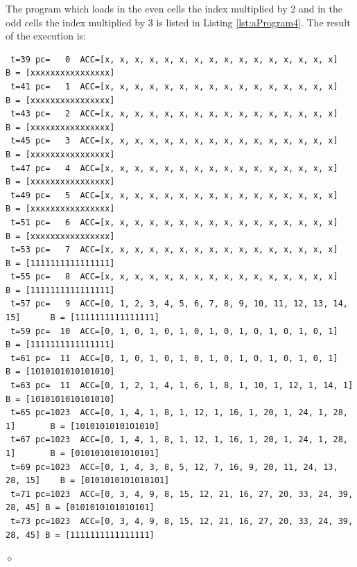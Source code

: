 \begin{exemplu}
The program which loads in the even cells the index multiplied by 2 and in the odd cells the index multiplied by 3 is listed in Listing \ref{lst:aProgram4}.
{\em 
{}
}
The result of the execution is:
{\scriptsize
\begin{verbatim}
 t=39 pc=   0  ACC=[x, x, x, x, x, x, x, x, x, x, x, x, x, x, x, x]            B = [xxxxxxxxxxxxxxxx]
 t=41 pc=   1  ACC=[x, x, x, x, x, x, x, x, x, x, x, x, x, x, x, x]            B = [xxxxxxxxxxxxxxxx]
 t=43 pc=   2  ACC=[x, x, x, x, x, x, x, x, x, x, x, x, x, x, x, x]            B = [xxxxxxxxxxxxxxxx]
 t=45 pc=   3  ACC=[x, x, x, x, x, x, x, x, x, x, x, x, x, x, x, x]            B = [xxxxxxxxxxxxxxxx]
 t=47 pc=   4  ACC=[x, x, x, x, x, x, x, x, x, x, x, x, x, x, x, x]            B = [xxxxxxxxxxxxxxxx]
 t=49 pc=   5  ACC=[x, x, x, x, x, x, x, x, x, x, x, x, x, x, x, x]            B = [xxxxxxxxxxxxxxxx]
 t=51 pc=   6  ACC=[x, x, x, x, x, x, x, x, x, x, x, x, x, x, x, x]            B = [xxxxxxxxxxxxxxxx]
 t=53 pc=   7  ACC=[x, x, x, x, x, x, x, x, x, x, x, x, x, x, x, x]            B = [1111111111111111]
 t=55 pc=   8  ACC=[x, x, x, x, x, x, x, x, x, x, x, x, x, x, x, x]            B = [1111111111111111]
 t=57 pc=   9  ACC=[0, 1, 2, 3, 4, 5, 6, 7, 8, 9, 10, 11, 12, 13, 14, 15]      B = [1111111111111111]
 t=59 pc=  10  ACC=[0, 1, 0, 1, 0, 1, 0, 1, 0, 1, 0, 1, 0, 1, 0, 1]            B = [1111111111111111]
 t=61 pc=  11  ACC=[0, 1, 0, 1, 0, 1, 0, 1, 0, 1, 0, 1, 0, 1, 0, 1]            B = [1010101010101010]
 t=63 pc=  11  ACC=[0, 1, 2, 1, 4, 1, 6, 1, 8, 1, 10, 1, 12, 1, 14, 1]         B = [1010101010101010]
 t=65 pc=1023  ACC=[0, 1, 4, 1, 8, 1, 12, 1, 16, 1, 20, 1, 24, 1, 28, 1]       B = [1010101010101010]
 t=67 pc=1023  ACC=[0, 1, 4, 1, 8, 1, 12, 1, 16, 1, 20, 1, 24, 1, 28, 1]       B = [0101010101010101]
 t=69 pc=1023  ACC=[0, 1, 4, 3, 8, 5, 12, 7, 16, 9, 20, 11, 24, 13, 28, 15]    B = [0101010101010101]
 t=71 pc=1023  ACC=[0, 3, 4, 9, 8, 15, 12, 21, 16, 27, 20, 33, 24, 39, 28, 45] B = [0101010101010101]
 t=73 pc=1023  ACC=[0, 3, 4, 9, 8, 15, 12, 21, 16, 27, 20, 33, 24, 39, 28, 45] B = [1111111111111111]
\end{verbatim}
}

$\diamond$
\end{exemplu}


